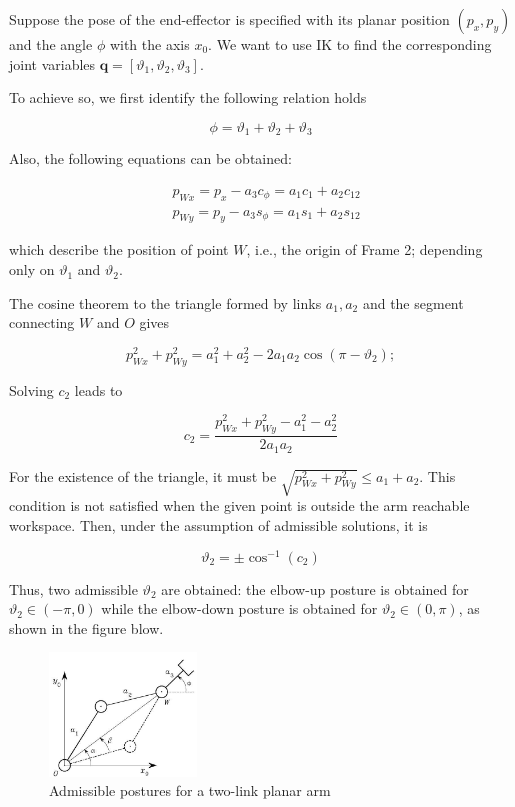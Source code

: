 \documentclass[10pt]{article}
\begin{document}
\noindent
Suppose the pose of the end-effector is specified with its planar position  $(p_{x}, p_{y})$ and the angle $\phi$ with the axis $x_{0}$.  We  want to use IK to find the corresponding joint variables $\boldsymbol{q}=[\vartheta_{1}, \vartheta_{2}, \vartheta_{3}]$.


To achieve so, we first identify the following relation holds

\begin{equation}\label{c1.l2.3link.sum}
    \phi=\vartheta_{1}+\vartheta_{2}+\vartheta_{3}
\end{equation}

\noindent
Also, the following equations can be obtained:

$$
\begin{aligned}
& p_{W x}=p_{x}-a_{3} c_{\phi}=a_{1} c_{1}+a_{2} c_{12} \\
& p_{W y}=p_{y}-a_{3} s_{\phi}=a_{1} s_{1}+a_{2} s_{12}
\end{aligned}
$$

\noindent
which describe the position of point $W$, i.e., the origin of Frame 2;  depending only on   $\vartheta_{1}$ and $\vartheta_{2}$.








The cosine theorem to the triangle formed by links $a_{1}, a_{2}$ and the segment connecting  $W$ and $O$ gives

$$
p_{W x}^{2}+p_{W y}^{2}=a_{1}^{2}+a_{2}^{2}-2 a_{1} a_{2} \cos \left(\pi-\vartheta_{2}\right) ;
$$

Solving $c_2$ leads to

$$
c_{2}=\frac{p_{W x}^{2}+p_{W y}^{2}-a_{1}^{2}-a_{2}^{2}}{2 a_{1} a_{2}}
$$



For the existence of the triangle, it must be $\sqrt{p_{W x}^{2}+p_{W y}^{2}} \leq a_{1}+a_{2}$. This condition is not satisfied when the given point is outside the arm reachable workspace. Then, under the assumption of admissible solutions, it is

$$
\vartheta_{2}= \pm \cos ^{-1}\left(c_{2}\right)
$$


Thus, two admissible $\vartheta_{2}$ are obtained: the elbow-up posture is obtained for $\vartheta_{2} \in(-\pi, 0)$ while the elbow-down posture is obtained for $\vartheta_{2} \in(0, \pi)$, as shown in the figure blow.


\begin{figure}[H]
    \centering
    \includegraphics[max width=0.35\textwidth]{./kinematics/postures_2link_arm}
    \caption{Admissible postures for a two-link planar arm}
    \label{fig:enter-label}
\end{figure}
\end{document}

